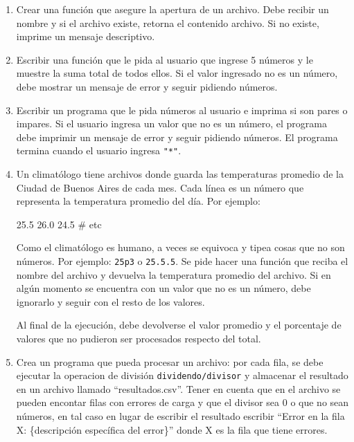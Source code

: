 \documentclass[
  letterpaper,
  DIV=11,
  numbers=noendperiod]{scrreprt}
\newenvironment{Shaded}{\begin{snugshade}}{\end{snugshade}}
\newcommand{\CommentTok}[1]{\textcolor[rgb]{0.37,0.37,0.37}{#1}}
\newcommand{\ExtensionTok}[1]{\textcolor[rgb]{0.00,0.23,0.31}{#1}}
\begin{document}
\begin{enumerate}
\def\labelenumi{\arabic{enumi}.}
\item
  Crear una función que asegure la apertura de un archivo. Debe recibir
  un nombre y si el archivo existe, retorna el contenido archivo. Si no
  existe, imprime un mensaje descriptivo.
\item
  Escribir una función que le pida al usuario que ingrese 5 números y le
  muestre la suma total de todos ellos. Si el valor ingresado no es un
  número, debe mostrar un mensaje de error y seguir pidiendo números.
\item
  Escribir un programa que le pida números al usuario e imprima si son
  pares o impares. Si el usuario ingresa un valor que no es un número,
  el programa debe imprimir un mensaje de error y seguir pidiendo
  números. El programa termina cuando el usuario ingresa \texttt{"*"}.
\item
  Un climatólogo tiene archivos donde guarda las temperaturas promedio
  de la Ciudad de Buenos Aires de cada mes. Cada línea es un número que
  representa la temperatura promedio del día. Por ejemplo:

\begin{Shaded}
\begin{Highlighting}[]
\ExtensionTok{25.5}
\ExtensionTok{26.0}
\ExtensionTok{24.5}
\CommentTok{\# etc}
\end{Highlighting}
\end{Shaded}

  Como el climatólogo es humano, a veces se equivoca y tipea cosas que
  no son números. Por ejemplo: \texttt{25p3} o \texttt{25.5.5}. Se pide
  hacer una función que reciba el nombre del archivo y devuelva la
  temperatura promedio del archivo. Si en algún momento se encuentra con
  un valor que no es un número, debe ignorarlo y seguir con el resto de
  los valores.

  Al final de la ejecución, debe devolverse el valor promedio y el
  porcentaje de valores que no pudieron ser procesados respecto del
  total.
\item
  Crea un programa que pueda procesar un archivo: por cada fila, se debe
  ejecutar la operacion de división \texttt{dividendo/divisor} y
  almacenar el resultado en un archivo llamado ``resultados.csv''. Tener
  en cuenta que en el archivo se pueden encontar filas con errores de
  carga y que el divisor sea 0 o que no sean números, en tal caso en
  lugar de escribir el resultado escribir ``Error en la fila X:
  \{descripción específica del error\}'' donde X es la fila que tiene
  errores.


\end{enumerate}
\end{document}
